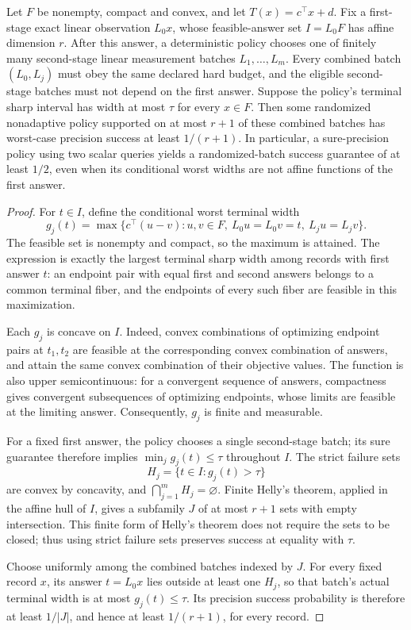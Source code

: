 \begin{theorem}
\label{thm:helly-precision}
Let $F$ be nonempty, compact and convex, and let $T(x)=c^\top x+d$.
Fix a first-stage exact linear observation $L_0x$, whose feasible-answer
set $I=L_0F$ has affine dimension $r$. After this answer, a deterministic
policy chooses one of finitely many second-stage linear measurement
batches $L_1,\ldots,L_m$. Every combined batch $(L_0,L_j)$ must obey the
same declared hard budget, and the eligible second-stage batches must not
depend on the first answer. Suppose the policy's terminal sharp interval
has width at most $\tau$ for every $x\in F$.
Then some randomized nonadaptive policy supported on at most $r+1$
of these combined batches has worst-case precision success at least
$1/(r+1)$.
In particular, a sure-precision policy using two scalar queries yields
a randomized-batch success guarantee of at least $1/2$, even when its
conditional worst widths are not affine functions of the first answer.
\end{theorem}
\begin{proof}
For $t\in I$, define the conditional worst terminal width
\[
 g_j(t)=\max\{c^\top(u-v):u,v\in F,\ L_0u=L_0v=t,
                                      \ L_ju=L_jv\}.
\]
The feasible set is nonempty and compact, so the maximum is attained.
The expression is exactly the largest terminal sharp width among records
with first answer $t$: an endpoint pair with equal first and second
answers belongs to a common terminal fiber, and the endpoints of every
such fiber are feasible in this maximization.

Each $g_j$ is concave on $I$. Indeed, convex combinations of optimizing
endpoint pairs at $t_1,t_2$ are feasible at the corresponding convex
combination of answers, and attain the same convex combination of their
objective values. The function is also upper semicontinuous: for a
convergent sequence of answers, compactness gives convergent subsequences
of optimizing endpoints, whose limits are feasible at the limiting
answer. Consequently, $g_j$ is finite and measurable.

For a fixed first answer, the policy chooses a single second-stage batch;
its sure guarantee therefore implies $\min_jg_j(t)\leq\tau$ throughout
$I$. The strict failure sets
\[
 H_j=\{t\in I:g_j(t)>\tau\}
\]
are convex by concavity, and $\bigcap_{j=1}^m H_j=\varnothing$.
Finite Helly's theorem, applied in the affine hull of $I$, gives a
subfamily $J$ of at most $r+1$ sets with empty intersection. This finite
form of Helly's theorem does not require the sets to be closed; thus
using strict failure sets preserves success at equality with $\tau$.

Choose uniformly among the combined batches indexed by $J$. For every
fixed record $x$, its answer $t=L_0x$ lies outside at least one $H_j$,
so that batch's actual terminal width is at most $g_j(t)\leq\tau$.
Its precision success probability is therefore at least $1/|J|$, and
hence at least $1/(r+1)$, for every record.
\end{proof}


